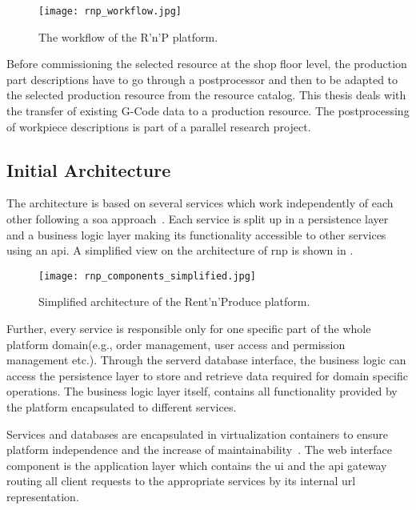 \documentclass[
a4paper,
twoside,
headsepline,
cleardoublepage=empty,
parskip=half,
draft=false
]{scrbook}
\begin{document}
			\begin{figure}[htbp]
				\centering
				\texttt{[image: rnp\_workflow.jpg]}
				\caption{The workflow of the R'n'P platform.}
				\label{fig:rnp_workflow}
			\end{figure}

			Before commissioning the selected resource at the shop floor level, the production part descriptions have to go through a postprocessor and then to be adapted to the selected production resource from the resource catalog.
			This thesis deals with the transfer of existing G-Code data to a production resource.
			The postprocessing of workpiece descriptions is part of a parallel research project.

			\subsection{Initial Architecture}\label{subsec:initial_architecture}

			The architecture is based on several services which work independently of each other following a \gls{soa} approach~\cite{erl2008soa}.
			Each service is split up in a persistence layer and a business logic layer making its functionality accessible to other services using an \gls{api}.
			A simplified view on the architecture of \gls{rnp} is shown in .

			\begin{figure}[htbp]
				\centering
				\texttt{[image: rnp\_components\_simplified.jpg]}
				\caption{Simplified architecture of the Rent'n'Produce platform.}
				\label{fig:rnp_architecture}
			\end{figure}

			Further, every service is responsible only for one specific part of the whole platform domain(e.g., order management, user access and permission management etc.).
			Through the serverd database interface, the business logic can access the persistence layer to store and retrieve data required for domain specific operations.
			The business logic layer itself, contains all functionality provided by the platform encapsulated to different services.

			Services and databases are encapsulated in virtualization containers to ensure platform independence and the increase of maintainability~\cite{xen.17b}.
			The web interface component is the application layer which contains the \gls{ui} and the \gls{api} gateway routing all client requests to the appropriate services by its internal \gls{url} representation.
\end{document}
